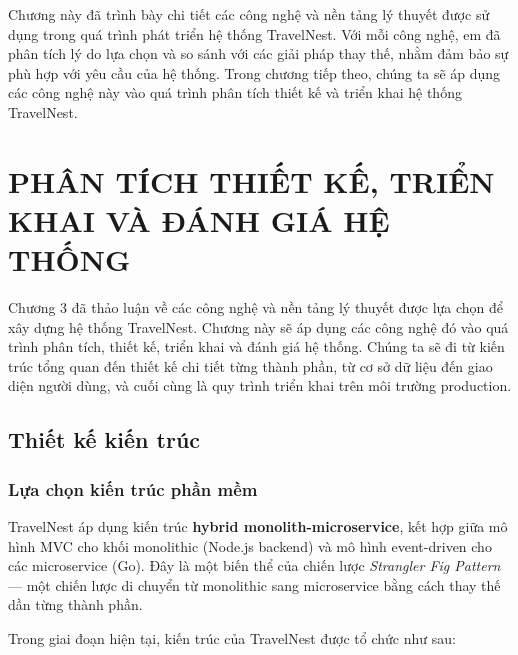 \documentclass[13pt,a4paper,twoside]{report}
\begin{document}
Chương này đã trình bày chi tiết các công nghệ và nền tảng lý thuyết được sử dụng trong quá trình phát triển hệ thống TravelNest. Với mỗi công nghệ, em đã phân tích lý do lựa chọn và so sánh với các giải pháp thay thế, nhằm đảm bảo sự phù hợp với yêu cầu của hệ thống. Trong chương tiếp theo, chúng ta sẽ áp dụng các công nghệ này vào quá trình phân tích thiết kế và triển khai hệ thống TravelNest.


\chapter{PHÂN TÍCH THIẾT KẾ, TRIỂN KHAI VÀ ĐÁNH GIÁ HỆ THỐNG}

Chương 3 đã thảo luận về các công nghệ và nền tảng lý thuyết được lựa chọn để xây dựng hệ thống TravelNest. Chương này sẽ áp dụng các công nghệ đó vào quá trình phân tích, thiết kế, triển khai và đánh giá hệ thống. Chúng ta sẽ đi từ kiến trúc tổng quan đến thiết kế chi tiết từng thành phần, từ cơ sở dữ liệu đến giao diện người dùng, và cuối cùng là quy trình triển khai trên môi trường production.

\section{Thiết kế kiến trúc}

\subsection{Lựa chọn kiến trúc phần mềm}

TravelNest áp dụng kiến trúc \textbf{hybrid monolith-microservice}, kết hợp giữa mô hình MVC cho khối monolithic (Node.js backend) và mô hình event-driven cho các microservice (Go). Đây là một biến thể của chiến lược \textit{Strangler Fig Pattern} --- một chiến lược di chuyển từ monolithic sang microservice bằng cách thay thế dần từng thành phần.

Trong giai đoạn hiện tại, kiến trúc của TravelNest được tổ chức như sau:
\end{document}
